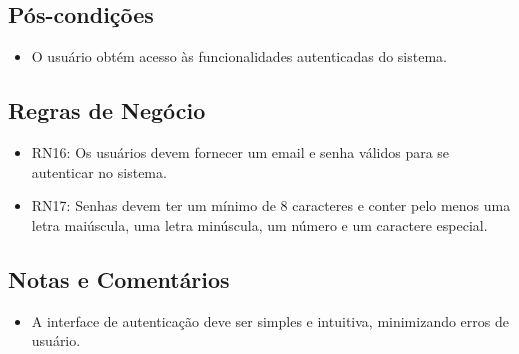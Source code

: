 \subsection*{Pós-condições}
\begin{addmargin}[1.5cm]{0cm}
	\begin{itemize}
		\item O usuário obtém acesso às funcionalidades autenticadas do sistema.
	\end{itemize}
\end{addmargin}

\subsection*{Regras de Negócio}
\begin{addmargin}[1.5cm]{0cm}
	\begin{itemize}
		\item RN16: Os usuários devem fornecer um email e senha válidos para se autenticar no sistema.
		\item RN17: Senhas devem ter um mínimo de 8 caracteres e conter pelo menos uma letra maiúscula, uma letra minúscula, um número e um caractere especial.
	\end{itemize}
\end{addmargin}

\subsection*{Notas e Comentários}
\begin{addmargin}[1.5cm]{0cm}
	\begin{itemize}
		\item A interface de autenticação deve ser simples e intuitiva, minimizando erros de usuário.
	\end{itemize}
\end{addmargin}
